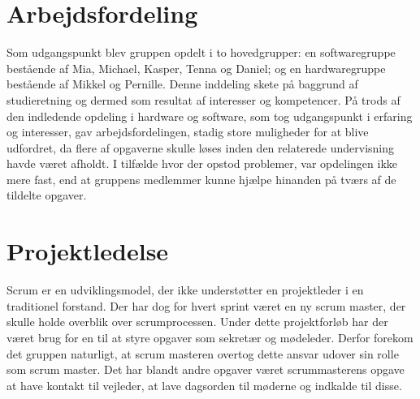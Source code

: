 \section{Arbejdsfordeling}
Som udgangspunkt blev gruppen opdelt i to hovedgrupper: en softwaregruppe bestående af Mia, Michael, Kasper, Tenna og Daniel; og en hardwaregruppe bestående af Mikkel og Pernille. Denne inddeling skete på baggrund af studieretning og dermed som resultat af interesser og kompetencer. På trods af den indledende opdeling i hardware og software, som tog udgangspunkt i erfaring og interesser, gav arbejdsfordelingen, stadig store muligheder for at blive udfordret, da flere af opgaverne skulle løses inden den relaterede undervisning havde været afholdt. I tilfælde hvor der opstod problemer, var opdelingen ikke mere fast, end at gruppens medlemmer kunne hjælpe hinanden på tværs af de tildelte opgaver. \\


\section{Projektledelse}
Scrum er en udviklingsmodel, der ikke understøtter en projektleder i en traditionel forstand. Der har dog for hvert sprint været en ny scrum master, der skulle holde overblik over scrumprocessen. Under dette projektforløb har der været brug for en til at styre opgaver som sekretær og mødeleder. Derfor forekom det gruppen naturligt, at scrum masteren overtog dette ansvar udover sin rolle som scrum master. Det har blandt andre opgaver været scrummasterens opgave at have kontakt til vejleder, at lave dagsorden til møderne og indkalde til disse.  

